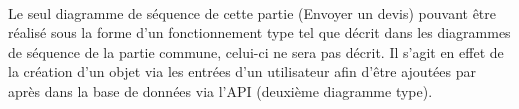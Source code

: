 \documentclass[]{article}
\begin{document}
\paragraph{}Le seul diagramme de séquence de cette partie (Envoyer un devis) pouvant être réalisé sous la forme d’un fonctionnement type tel que décrit dans les diagrammes de séquence de la partie commune, celui-ci ne sera pas décrit. Il s’agit en effet de la création d’un objet via les entrées d’un utilisateur afin d’être ajoutées par après dans la base de données via l’API (deuxième diagramme type). 
\end{document}
